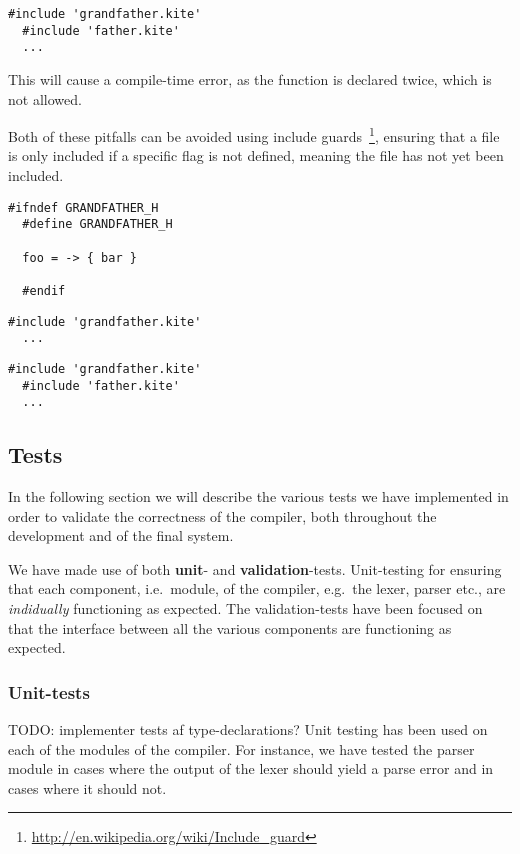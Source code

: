\begin{lstlisting}[caption=\code{child.kite}]
  #include 'grandfather.kite'
  #include 'father.kite'
  ...
\end{lstlisting}

This will cause a compile-time error, as the  function is
declared twice, which is not allowed.

Both of these pitfalls can be avoided using include
guards~\footnote{\url{http://en.wikipedia.org/wiki/Include_guard}},
ensuring that a file is only included if a specific flag is not
defined, meaning the file has not yet been included.

\begin{lstlisting}[caption=\code{grandfather.kite}]
  #ifndef GRANDFATHER_H
  #define GRANDFATHER_H

  foo = -> { bar }

  #endif
\end{lstlisting}

\begin{lstlisting}[caption=\code{father.kite}]
  #include 'grandfather.kite'
  ...
\end{lstlisting}

\begin{lstlisting}[caption=\code{child.kite}]
  #include 'grandfather.kite'
  #include 'father.kite'
  ...
\end{lstlisting}


\subsection{Tests}
In the following section we will describe the various tests we have implemented in order to validate the correctness of the compiler, both throughout the development and of the final system.

We have made use of both \textbf{unit}- and \textbf{validation}-tests. Unit-testing for ensuring that each component, i.e.\ module, of the compiler, e.g.\ the lexer, parser etc., are \emph{indidually} functioning as expected. The validation-tests have been focused on that the interface between all the various components are functioning as expected.

\subsubsection{Unit-tests}  TODO: implementer tests af type-declarations?
Unit testing has been used on each of the modules of the
compiler. For instance, we have tested the parser module in cases
where the output of the lexer should yield a parse error and in cases
where it should not.

